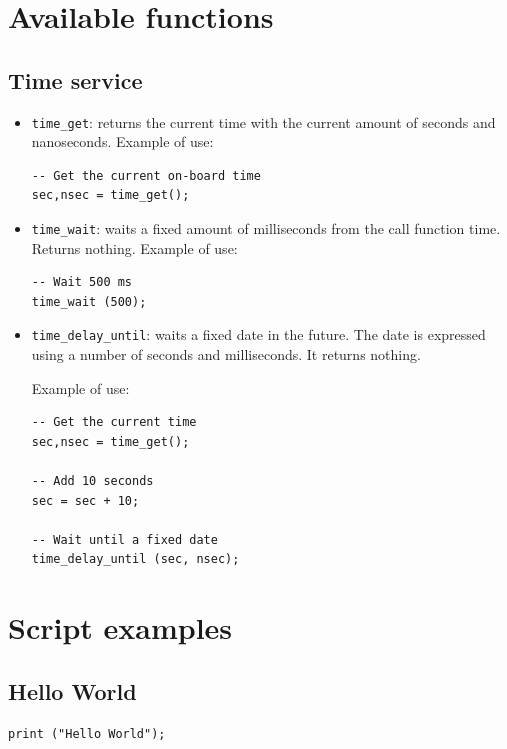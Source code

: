 \documentclass[11pt]{book}
\begin{document}
{   \section{Available functions}
      \subsection{Time service}
      \begin{itemize}
         \item
            \texttt{time\_get}: returns the current time with the current amount
            of seconds and nanoseconds.
            Example of use:
\begin{lstlisting}
-- Get the current on-board time
sec,nsec = time_get();
\end{lstlisting}

         \item
            \texttt{time\_wait}: waits a fixed amount of milliseconds from the
            call function time.
            Returns nothing.
 Example of use:
\begin{lstlisting}
-- Wait 500 ms
time_wait (500);
\end{lstlisting}


         \item
            \texttt{time\_delay\_until}: waits a fixed date in the future. The
            date is expressed using a number of seconds and milliseconds. It
            returns nothing.

 Example of use:
\begin{lstlisting}
-- Get the current time
sec,nsec = time_get();

-- Add 10 seconds
sec = sec + 10;

-- Wait until a fixed date
time_delay_until (sec, nsec);
\end{lstlisting}
      \end{itemize}

   \section{Script examples}

      \subsection{Hello World}
\begin{lstlisting}
print ("Hello World");
\end{lstlisting}


}
\end{document}
